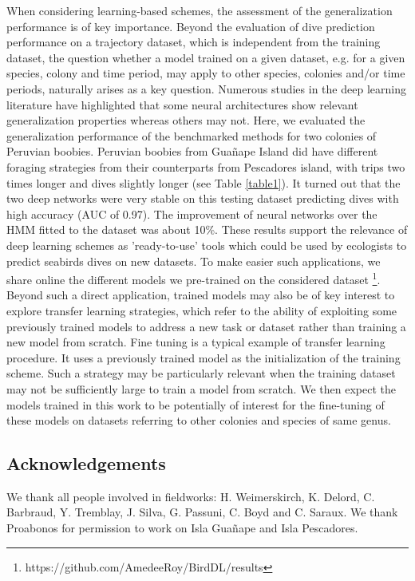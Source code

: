 \documentclass{article}
\begin{document}
When considering learning-based schemes, the assessment of the generalization performance is of key importance. Beyond the evaluation of dive prediction performance on a trajectory dataset, which is independent from the training dataset, the question whether a model trained on a given dataset, e.g. for a given species, colony and time period, may apply to other species, colonies and/or time periods, naturally arises as a key question. Numerous studies in the deep learning literature \cite{kawaguchi_generalization_2020,zhang_understanding_2017} have highlighted that some neural architectures show relevant generalization properties whereas others may not.
Here, we evaluated the generalization performance of the benchmarked methods for two colonies of Peruvian boobies.
Peruvian boobies from  Guañape Island did have different foraging strategies from their counterparts from Pescadores island, with trips two times longer and dives slightly longer (see Table \ref{table1}). It turned out that the two deep networks were very stable on this testing dataset predicting dives with high accuracy (AUC of 0.97). The improvement of neural networks over the HMM fitted to the dataset was about 10\%.
These results support the relevance of deep learning schemes as
'ready-to-use' tools which could be used by ecologists to predict
seabirds dives on new datasets. To make easier such applications, we share online the different models we pre-trained on the considered dataset \footnote{https://github.com/AmedeeRoy/BirdDL/results}.
Beyond such a direct application, trained models may also be of key interest to explore transfer learning strategies, which refer to the ability of exploiting some previously trained models to address a new task or dataset rather than training a new model from scratch. Fine tuning is a typical example of transfer learning procedure. It uses a previously trained model as the initialization of the training scheme. Such a strategy may be particularly relevant when the training dataset may not be sufficiently large to train a model from scratch. We then expect the models trained in this work to be potentially of interest for the fine-tuning of these models on datasets referring to other colonies and species of same genus.

\subsection*{Acknowledgements}
We thank all people involved in fieldworks: H. Weimerskirch, K. Delord, C. Barbraud, Y. Tremblay, J. Silva, G. Passuni, C. Boyd and C. Saraux. We thank Proabonos for permission to work on Isla Gua\~nape  and Isla Pescadores.
\end{document}
